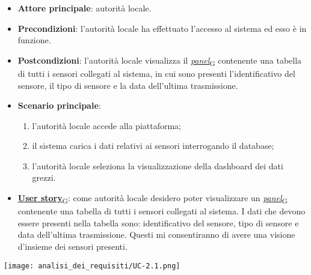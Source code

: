 \begin{itemize}
	\item \textbf{Attore principale}: autorità locale.
	\item \textbf{Precondizioni}: l'autorità locale ha effettuato l'accesso al sistema ed esso è in funzione.
	\item \textbf{Postcondizioni}: l'autorità locale visualizza il \href{https://7last.github.io/docs/rtb/documentazione-interna/glossario\#panel}{\textit{panel}\textsubscript{G}} contenente una tabella di tutti i sensori collegati al sistema,
	      in cui sono presenti l'identificativo del sensore, il tipo di sensore e la data dell'ultima trasmissione.
	\item \textbf{Scenario principale}:
	      \begin{enumerate}
		      \item l'autorità locale accede alla piattaforma;
		      \item il sistema carica i dati relativi ai sensori interrogando il database;
		      \item l'autorità locale seleziona la visualizzazione della dashboard dei dati grezzi.
	      \end{enumerate}
	\item \href{https://7last.github.io/docs/rtb/documentazione-interna/glossario\#user-story}{\textbf{User story}\textsubscript{G}}: come autorità locale desidero poter visualizzare un \href{https://7last.github.io/docs/rtb/documentazione-interna/glossario\#panel}{\textit{panel}\textsubscript{G}} contenente una tabella di tutti i sensori collegati al sistema. I dati che devono essere presenti nella tabella sono: identificativo del sensore, tipo di sensore e data dell'ultima trasmissione. Questi mi consentiranno di avere una visione d'insieme dei sensori presenti.
\end{itemize}
\begin{center}
	\texttt{[image: analisi\_dei\_requisiti/UC-2.1.png]}
\end{center}

